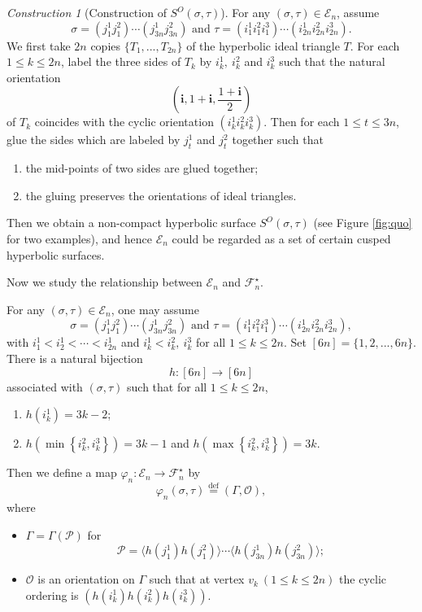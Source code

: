 \documentclass{amsart}
\theoremstyle{plain}
\theoremstyle{definition}
\theoremstyle{remark}
\newtheorem*{Cons*}{Construction}
\begin{document}
\begin{Cons*}[Construction of $S^O(\sigma,\tau)$]
For any $(\sigma,\tau)\in\mathcal{E}_n$, assume
$$\sigma=\left(j_1^1j_1^2\right)\cdots(j_{3n}^1j_{3n}^2)\text{ and }\tau=\left(i_1^1i_1^2i_1^3\right)\cdots\left(i_{2n}^1i_{2n}^2i_{2n}^3\right).$$
We first take $2n$ copies $\{T_1,...,T_{2n}\}$ of the hyperbolic ideal triangle $T$. For each $1\leq k\leq 2n$, label the three sides of $T_k$ by $i_k^1,\ i_k^2$ and $i_k^3$ such that the natural orientation 
$$\left(\textbf{i},1+\textbf{i},\frac{1+\textbf{i}}{2}\right)$$
of $T_k$ coincides with the cyclic orientation $(i_k^1 i_k^2 i_k^3)$.
Then for each $1\leq t\leq 3n$, glue the sides which are labeled by $j_t^1$ and $j_t^2$ together such that
\begin{enumerate}
    \item the mid-points of two sides are glued together;
    \item the gluing preserves the orientations of ideal triangles.
\end{enumerate}
Then we obtain a non-compact hyperbolic surface $S^O(\sigma,\tau)$ (see Figure \ref{fig:quo} for two examples), and hence $\mathcal{E}_n$ could be regarded as a set of certain cusped hyperbolic surfaces.
\end{Cons*}

Now we study the relationship between $\mathcal{E}_n$ and $\mathcal{F}_n^\star$.

For any $(\sigma,\tau)\in\mathcal{E}_n$, one may assume
$$\sigma=\left(j_1^1j_1^2\right)\cdots(j_{3n}^1j_{3n}^2)\text{ and }\tau=\left(i_1^1i_1^2i_1^3\right)\cdots\left(i_{2n}^1i_{2n}^2i_{2n}^3\right),$$
with $i_1^1<i_2^1<\cdots<i_{2n}^1$ and $i_k^1<i_k^2,\ i_k^3$ for all $1\leq k\leq 2n$.
Set $[6n]=\{1,2,...,6n\}$. There is a natural bijection $$h:[6n]\to [6n]$$ associated with $(\sigma,\tau)$ such that for all $1\leq k\leq 2n$,
\begin{enumerate}
    \item $h(i_{k}^1)=3k-2$;
    \item $h\left(\min\left\{i_k^2,i_{k}^3\right\}\right)=3k-1$ and $h\left(\max\left\{i_k^2,i_{k}^3\right\}\right)=3k$.
\end{enumerate}
Then we define a map $\varphi_n: \mathcal{E}_n\to\mathcal{F}_n^\star$ by 
$$\varphi_n(\sigma,\tau)\overset{\mathrm{def}}{=}(\Gamma,\mathcal{O}),$$
where
\begin{itemize}
    \item $\Gamma=\Gamma(\mathcal{P})$ for 
    $$\mathcal{P}=\langle h(j_1^1)h(j_1^2)\rangle\cdots\langle h(j_{3n}^1)h(j_{3n}^2)\rangle;$$
    \item $\mathcal{O}$ is an orientation on $\Gamma$ such that at vertex $v_k\ (1\leq k\leq 2n)$ the cyclic ordering is $\left(h(i_k^1)h(i_k^2)h(i_k^3)\right).$
\end{itemize}
\end{document}
